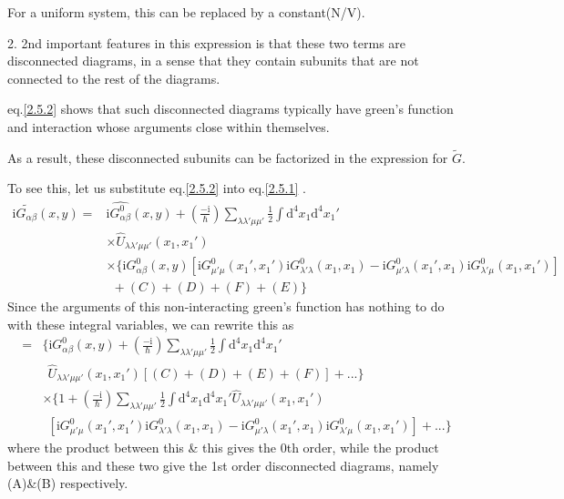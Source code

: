 For a uniform system, this can be replaced by a constant(N/V).

2. 2nd important features in this expression is that these two terms are  disconnected diagrams, in a sense that they contain subunits that are not connected to the rest of the diagrams.

eq.\eqref{2.5.2} shows that such disconnected diagrams typically have green's function and interaction whose arguments close within themselves.

As a result, these disconnected subunits can be factorized in the expression for $\tilde{G}$.

To see this, let us substitute eq.\eqref{2.5.2} into eq.\eqref{2.5.1} .
\begin{align}
\mathrm{i}\tilde{G_{\alpha\beta}}(x,y)=&\mathrm{i}\hat{G_{\alpha\beta}^0}(x,y)+(\frac{-\mathrm{i}}{\hbar})\sum_{\lambda\lambda'\mu\mu'}\frac{1}{2}\int\mathrm{d}^4x_1\mathrm{d}^4x_1' \nonumber \\
&\times \hat{U}_{\lambda\lambda'\mu\mu'}(x_1,x_1') \nonumber \\
&\times\{\mathrm{i}G_{\alpha\beta}^0(x,y)[\mathrm{i}G^0_{\mu'\mu}(x_1',x_1')\mathrm{i}G^0_{\lambda'\lambda}(x_1,x_1)-\mathrm{i}G^0_{\mu'\lambda}(x_1',x_1)\mathrm{i}G^0_{\lambda'\mu}(x_1,x_1')]\nonumber \\
&\ \ +(C)+(D)+(F)+(E)\} \nonumber
\end{align}
Since the arguments of this non-interacting green's function has nothing to do with these integral variables, we can rewrite this as
\begin{align}
=&\{\mathrm{i}G_{\alpha\beta}^0(x,y)+(\frac{-\mathrm{i}}{\hbar})\sum_{\lambda\lambda'\mu\mu'}\frac{1}{2}\int\mathrm{d}^4x_1\mathrm{d}^4x_1' \nonumber \\
&\ \ \hat{U}_{\lambda\lambda'\mu\mu'}(x_1,x_1')[(C)+(D)+(E)+(F)]+...\} \nonumber \\
&\times \{1+(\frac{-\mathrm{i}}{\hbar})\sum_{\lambda\lambda'\mu\mu'}\frac{1}{2}\int\mathrm{d}^4x_1\mathrm{d}^4x_1'\hat{U}_{\lambda\lambda'\mu\mu'}(x_1,x_1') \nonumber \\
&\ \ [\mathrm{i}G^0_{\mu'\mu}(x_1',x_1')\mathrm{i}G^0_{\lambda'\lambda}(x_1,x_1)-\mathrm{i}G^0_{\mu'\lambda}(x_1',x_1)\mathrm{i}G^0_{\lambda'\mu}(x_1,x_1')]+...\} \nonumber
\end{align}
where the product between this \& this gives the 0th order, while the product between this and these two give the 1st order disconnected diagrams, namely (A)\&(B) respectively.


